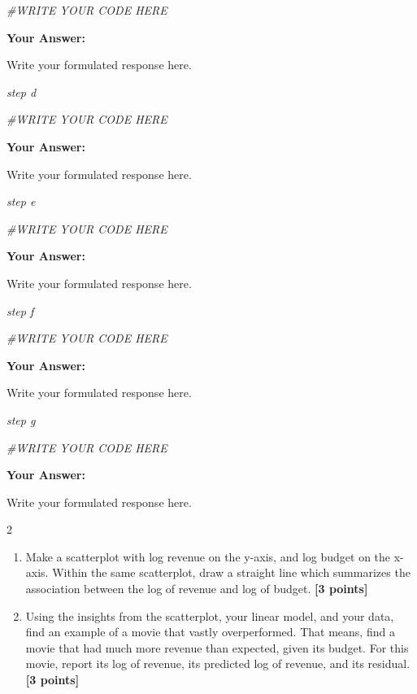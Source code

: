 \documentclass[
]{article}
\newenvironment{Shaded}{\begin{snugshade}}{\end{snugshade}}
\newcommand{\CommentTok}[1]{\textcolor[rgb]{0.56,0.35,0.01}{\textit{#1}}}
\providecommand{\tightlist}{%
  \setlength{\itemsep}{0pt}\setlength{\parskip}{0pt}}
\begin{document}
\begin{Shaded}
\begin{Highlighting}[]
\CommentTok{\#WRITE YOUR CODE HERE}
\end{Highlighting}
\end{Shaded}

\textbf{Your Answer:}

Write your formulated response here.

\emph{step d}

\begin{Shaded}
\begin{Highlighting}[]
\CommentTok{\#WRITE YOUR CODE HERE}
\end{Highlighting}
\end{Shaded}

\textbf{Your Answer:}

Write your formulated response here.

\emph{step e}

\begin{Shaded}
\begin{Highlighting}[]
\CommentTok{\#WRITE YOUR CODE HERE}
\end{Highlighting}
\end{Shaded}

\textbf{Your Answer:}

Write your formulated response here.

\emph{step f}

\begin{Shaded}
\begin{Highlighting}[]
\CommentTok{\#WRITE YOUR CODE HERE}
\end{Highlighting}
\end{Shaded}

\textbf{Your Answer:}

Write your formulated response here.

\emph{step g}

\begin{Shaded}
\begin{Highlighting}[]
\CommentTok{\#WRITE YOUR CODE HERE}
\end{Highlighting}
\end{Shaded}

\textbf{Your Answer:}

Write your formulated response here.

2

\begin{enumerate}
\def\labelenumi{\alph{enumi}.}
\tightlist
\item
  Make a scatterplot with log revenue on the y-axis, and log budget on
  the x-axis. Within the same scatterplot, draw a straight line which
  summarizes the association between the log of revenue and log of
  budget. \textbf{[3 points]}
\item
  Using the insights from the scatterplot, your linear model, and your
  data, find an example of a movie that vastly overperformed. That
  means, find a movie that had much more revenue than expected, given
  its budget. For this movie, report its log of revenue, its predicted
  log of revenue, and its residual. \textbf{[3 points]}
\end{enumerate}
\end{document}
